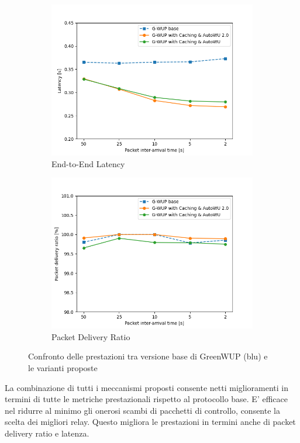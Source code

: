 \begin{figure}[H]
\begin{subfigure}[t]{0.49\linewidth}
    \includegraphics[width=1.1\linewidth]{Contents/Images/graphs/final2.0/latency.png}
    \caption{End-to-End Latency}
    \label{fig:Latency_final2.0}
  \end{subfigure}
  \begin{subfigure}[t]{0.49\linewidth}
    \includegraphics[width=1.1\linewidth]{Contents/Images/graphs/final2.0/pdr.png}
    \caption{Packet Delivery Ratio}
    \label{fig:PDR_final2.0}
  \end{subfigure}
  \caption{Confronto delle prestazioni tra versione base di GreenWUP (blu) e le varianti proposte}
  \label{fig:final2.0}
\end{figure}

La combinazione di tutti i meccanismi proposti consente netti miglioramenti in termini di tutte le metriche prestazionali rispetto al protocollo base. E' efficace nel ridurre al minimo gli onerosi scambi di pacchetti di controllo, consente la scelta dei migliori relay. Questo migliora le prestazioni in termini anche di packet delivery ratio e latenza.